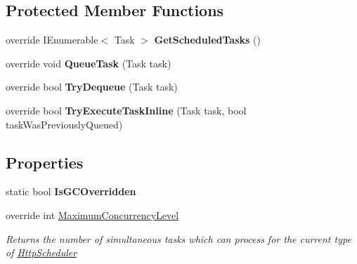 \subsection*{Protected Member Functions}
\begin{DoxyCompactItemize}
\item 
\hypertarget{class_cloud_api_public_1_1_sync_1_1_http_scheduler_ac39e6ca2502a49a8e201bf9352d4256c}{override I\-Enumerable$<$ Task $>$ {\bfseries Get\-Scheduled\-Tasks} ()}\label{class_cloud_api_public_1_1_sync_1_1_http_scheduler_ac39e6ca2502a49a8e201bf9352d4256c}

\item 
\hypertarget{class_cloud_api_public_1_1_sync_1_1_http_scheduler_ab0dfca7ebe07e2ca95a07dd17bcb6e42}{override void {\bfseries Queue\-Task} (Task task)}\label{class_cloud_api_public_1_1_sync_1_1_http_scheduler_ab0dfca7ebe07e2ca95a07dd17bcb6e42}

\item 
\hypertarget{class_cloud_api_public_1_1_sync_1_1_http_scheduler_a7c79395e68ff622c010f4017ed9f6a79}{override bool {\bfseries Try\-Dequeue} (Task task)}\label{class_cloud_api_public_1_1_sync_1_1_http_scheduler_a7c79395e68ff622c010f4017ed9f6a79}

\item 
\hypertarget{class_cloud_api_public_1_1_sync_1_1_http_scheduler_a19d51cc06bfa728b73e25dd966d4af2d}{override bool {\bfseries Try\-Execute\-Task\-Inline} (Task task, bool task\-Was\-Previously\-Queued)}\label{class_cloud_api_public_1_1_sync_1_1_http_scheduler_a19d51cc06bfa728b73e25dd966d4af2d}

\end{DoxyCompactItemize}
\subsection*{Properties}
\begin{DoxyCompactItemize}
\item 
\hypertarget{class_cloud_api_public_1_1_sync_1_1_http_scheduler_ae7b9d7ce395e2bda3d644fcab585e3c4}{static bool {\bfseries Is\-G\-C\-Overridden}}\label{class_cloud_api_public_1_1_sync_1_1_http_scheduler_ae7b9d7ce395e2bda3d644fcab585e3c4}

\item 
override int \hyperlink{class_cloud_api_public_1_1_sync_1_1_http_scheduler_a2d4b8f13a92d4825cf12e9eb18578d95}{Maximum\-Concurrency\-Level}
\begin{DoxyCompactList}\small\item\em Returns the number of simultaneous tasks which can process for the current type of \hyperlink{class_cloud_api_public_1_1_sync_1_1_http_scheduler}{Http\-Scheduler} \end{DoxyCompactList}\end{DoxyCompactItemize}


